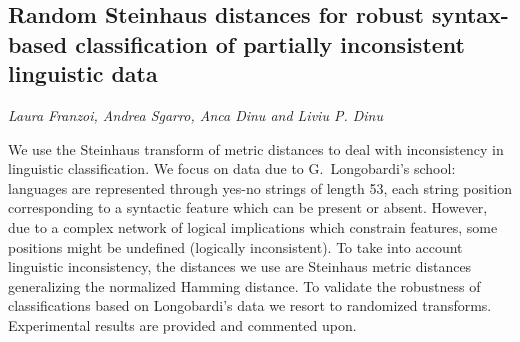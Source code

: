 \documentclass[../booklet.tex]{subfiles}
\begin{document}
\subsection[Random Steinhaus distances for robust syntax-based classification of partially inconsistent linguistic data. {\it Laura Franzoi, Andrea Sgarro, Anca Dinu and Liviu P. Dinu}]{Random Steinhaus distances for robust syntax-based classification of partially inconsistent linguistic data}
   

\begin{center}
  {\it Laura Franzoi, Andrea Sgarro, Anca Dinu and Liviu P. Dinu}
\end{center}

\vskip 0.8cm


We use the Steinhaus transform of metric distances to deal with inconsistency in linguistic classification.  We focus on data due to G.\ Longobardi's school: languages are represented through yes-no strings of length 53, each string position corresponding to a syntactic feature which can be present or absent. However, due to a complex network of logical implications which constrain features, some positions might be undefined (logically inconsistent). To take into account linguistic inconsistency, the distances we use are Steinhaus metric distances generalizing the normalized Hamming distance. To validate the robustness of classifications based on Longobardi's data we resort to randomized transforms. Experimental results are provided and commented upon.
\end{document}
